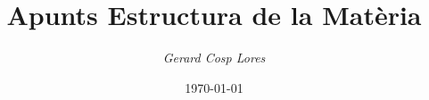 \documentclass[12pt]{article}
\title{\textbf{Apunts Estructura de la Matèria}}
\author{\textit{Gerard Cosp Lores}}
\date{\today}
\begin{document}
\justifying

\maketitle
\end{document}
